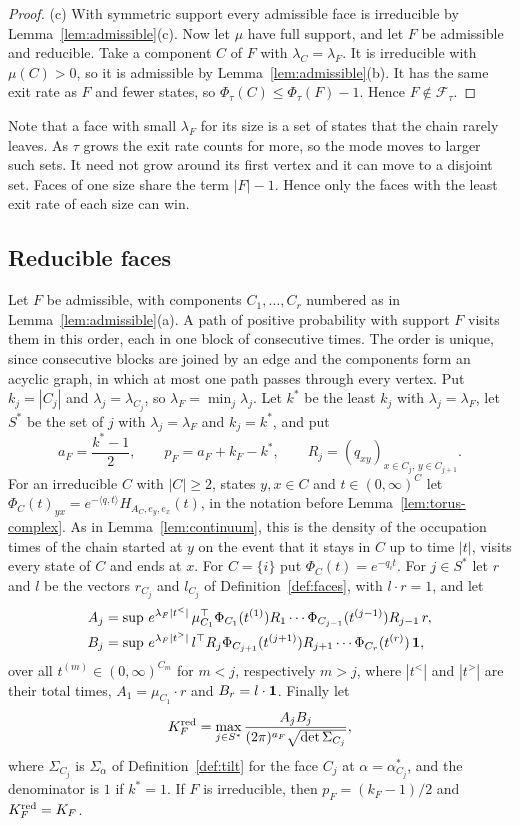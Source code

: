 \begin{proof}
(c) With symmetric support every admissible face is irreducible by
Lemma~\ref{lem:admissible}(c). Now let $\mu$ have full support, and let $F$ be admissible and
reducible. Take a component $C$ of $F$ with $\lambda_C=\lambda_F$. It is irreducible with
$\mu(C)>0$, so it is admissible by Lemma~\ref{lem:admissible}(b). It has the same exit rate as
$F$ and fewer states, so $\Phi_\tau(C)\le\Phi_\tau(F)-1$. Hence $F\notin\mathcal F_\tau$.
\end{proof}

Note that a face with small $\lambda_F$ for its size is a set of states that the chain
rarely leaves. As $\tau$ grows the exit rate counts for more, so the mode moves
to larger such sets. It need not grow around its first vertex and it can move
to a disjoint set. Faces of one size share the term $\lvert F\rvert-1$. Hence only
the faces with the least exit rate of each size can win.

\subsection{Reducible faces}\label{sec:reducible-max}

Let $F$ be admissible, with components $C_1,\dots,C_r$ numbered as in
Lemma~\ref{lem:admissible}(a). A path of positive probability with support $F$ visits them in
this order, each in one block of consecutive times. The order is unique, since consecutive
blocks are joined by an edge and the components form an acyclic graph, in which at most one path
passes through every vertex. Put $k_j=|C_j|$ and $\lambda_j=\lambda_{C_j}$, so
$\lambda_F=\min_j\lambda_j$. Let $k^*$ be the least $k_j$ with $\lambda_j=\lambda_F$, let
$S^*$ be the set of $j$ with $\lambda_j=\lambda_F$ and $k_j=k^*$, and put
\[
a_F=\frac{k^*-1}2,\qquad p_F=a_F+k_F-k^*,\qquad R_j=(q_{xy})_{x\in C_j,\,y\in C_{j+1}} .
\]
For an irreducible $C$ with $|C|\ge2$, states $y,x\in C$ and $t\in(0,\infty)^C$ let
$\Phi_C(t)_{yx}=e^{-\langle q,t\rangle}H_{A_C,e_y,e_x}(t)$, in the notation before
Lemma~\ref{lem:torus-complex}. As in Lemma~\ref{lem:continuum}, this is the density of the
occupation times of the chain started at $y$ on the event that it stays in $C$ up to time
$|t|$, visits every state of $C$ and ends at $x$. For $C=\{i\}$ put $\Phi_C(t)=e^{-q_it}$. For
$j\in S^*$ let $r$ and $l$ be the vectors $r_{C_j}$ and $l_{C_j}$ of Definition~\ref{def:faces},
with $l\cdot r=1$, and let
\begin{align*}
A_j&=\sup\,e^{\lambda_F|t^<|}\,\mu_{C_1}^\top\Phi_{C_1}(t^{(1)})R_1\cdots\Phi_{C_{j-1}}(t^{(j-1)})R_{j-1}\,r,\\
B_j&=\sup\,e^{\lambda_F|t^>|}\,l^\top R_j\Phi_{C_{j+1}}(t^{(j+1)})R_{j+1}\cdots\Phi_{C_r}(t^{(r)})\,\ones,
\end{align*}
over all $t^{(m)}\in(0,\infty)^{C_m}$ for $m<j$, respectively $m>j$, where $|t^<|$ and $|t^>|$
are their total times, $A_1=\mu_{C_1}\cdot r$ and $B_r=l\cdot\mathbf{1}$. Finally let
\[
K^{\rm red}_F=\max_{j\in S^*}\frac{A_jB_j}{(2\pi)^{a_F}\sqrt{\det\Sigma_{C_j}}},
\]
where $\Sigma_{C_j}$ is $\Sigma_\alpha$ of Definition~\ref{def:tilt} for the face $C_j$ at
$\alpha=\alpha^*_{C_j}$, and the denominator is $1$ if $k^*=1$. If $F$ is irreducible, then
$p_F=(k_F-1)/2$ and $K^{\rm red}_F=K_F$.

